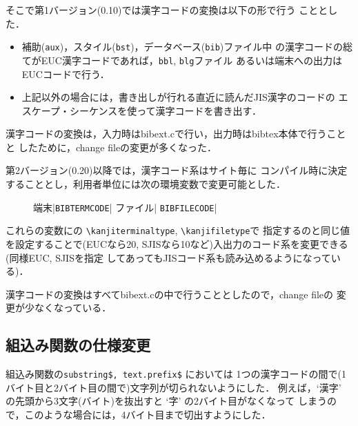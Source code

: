 そこで第1バージョン(0.10)では漢字コードの変換は以下の形で行う
こととした．

\begin{itemize}
\item 補助({\tt aux})，スタイル({\tt bst})，データベース({\tt bib})ファイル中
の漢字コードの総てがEUC漢字コードであれば，{\tt bbl}, {\tt blg}ファイル
あるいは端末への出力はEUCコードで行う．
\item 上記以外の場合には，書き出しが行れる直近に読んだJIS漢字のコードの
エスケープ・シーケンスを使って漢字コードを書き出す．
\end{itemize}

漢字コードの変換は，入力時はbibext.cで行い，出力時はbibtex本体で行うことと
したために，change fileの変更が多くなった．

第2バージョン(0.20)以降では，漢字コード系はサイト毎に
コンパイル時に決定することとし，利用者単位には次の環境変数で変更可能とした．

\begin{figure}[h]
\thicksize=0pt
\thinsize=0pt
\begintable
端末\hfill |{\tt BIBTERMCODE}\hfill | \hskip5cm\cr
ファイル\hfill | {\tt BIBFILECODE}\hfill | \hskip5cm\endtable
\end{figure}

これらの変数に\JTeX の \verb|\kanjiterminaltype|, \verb|\kanjifiletype|で
指定するのと同じ値を設定することで(EUCなら20,
SJISなら10など)入出力のコード系を変更できる(\JTeX 同様EUC, SJISを指定
してあってもJISコード系も読み込めるようになっている)．

漢字コードの変換はすべてbibext.cの中で行うこととしたので，change fileの
変更が少なくなっている．

\subsection{組込み関数の仕様変更}

組込み関数の{\tt substring\$, text.prefix\$} においては
1つの漢字コードの間で(1バイト目と2バイト目の間で)文字列が切られないようにした．
例えば，`漢字' の先頭から3文字(バイト)を抜出すと `字' の2バイト目がなくなって
しまうので，このような場合には，4バイト目まで切出すようにした．
 

